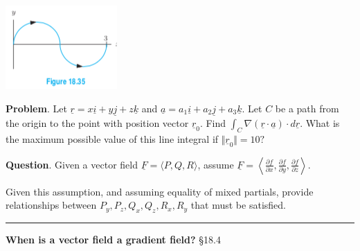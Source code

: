 \documentclass[12pt,letterpaper,noanswers]{exam}
\newcommand{\mb}[1]{\underline{#1}}
\begin{document}
\includegraphics{img/C22p2.png}


\vfill

\noindent\textbf{Problem}.  Let $\mb r = x\mb i + y\mb j + z\mb k$ and $\mb a = a_1\mb i + a_2\mb j + a_3\mb k$.  Let $C$ be a path from the origin to the point with position vector $\mb r_0$.  Find $\int_C \nabla(\mb r\cdot \mb a)\cdot d\mb r$.  What is the maximum possible value of this line integral if $\Vert \mb r_0\Vert = 10?$
\vfill



\noindent\textbf{Question}.  Given a vector field $\mb F = \langle P, Q, R\rangle$, assume $\displaystyle\mb F = \left\langle \frac{\partial f}{\partial x}, \frac{\partial f}{\partial y}, \frac{\partial f}{\partial z}\right\rangle$.

Given this assumption, and assuming equality of mixed partials, provide relationships between $P_y, P_z, Q_x, Q_z, R_x, R_y$ that must be satisfied.


\eject
\vspace{0.2cm}
\hrule
\vspace{0.2cm}


\noindent\textbf{When is a vector field a gradient field?} \S 18.4
\end{document}
